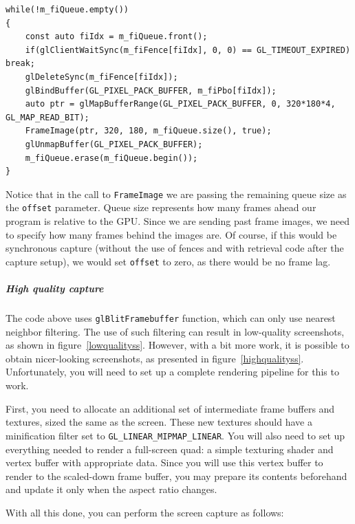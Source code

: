 \documentclass[hidelinks,titlepage,a4paper]{article}
\begin{document}
\begin{lstlisting}
while(!m_fiQueue.empty())
{
    const auto fiIdx = m_fiQueue.front();
    if(glClientWaitSync(m_fiFence[fiIdx], 0, 0) == GL_TIMEOUT_EXPIRED) break;
    glDeleteSync(m_fiFence[fiIdx]);
    glBindBuffer(GL_PIXEL_PACK_BUFFER, m_fiPbo[fiIdx]);
    auto ptr = glMapBufferRange(GL_PIXEL_PACK_BUFFER, 0, 320*180*4, GL_MAP_READ_BIT);
    FrameImage(ptr, 320, 180, m_fiQueue.size(), true);
    glUnmapBuffer(GL_PIXEL_PACK_BUFFER);
    m_fiQueue.erase(m_fiQueue.begin());
}
\end{lstlisting}

Notice that in the call to \texttt{FrameImage} we are passing the remaining queue size as the \texttt{offset} parameter. Queue size represents how many frames ahead our program is relative to the GPU. Since we are sending past frame images, we need to specify how many frames behind the images are. Of course, if this would be synchronous capture (without the use of fences and with retrieval code after the capture setup), we would set \texttt{offset} to zero, as there would be no frame lag.

\subparagraph{High quality capture}

The code above uses \texttt{glBlitFramebuffer} function, which can only use nearest neighbor filtering. The use of such filtering can result in low-quality screenshots, as shown in figure~\ref{lowqualityss}. However, with a bit more work, it is possible to obtain nicer-looking screenshots, as presented in figure~\ref{highqualityss}. Unfortunately, you will need to set up a complete rendering pipeline for this to work.

First, you need to allocate an additional set of intermediate frame buffers and textures, sized the same as the screen. These new textures should have a minification filter set to \texttt{GL\_LINEAR\_MIPMAP\_LINEAR}. You will also need to set up everything needed to render a full-screen quad: a simple texturing shader and vertex buffer with appropriate data. Since you will use this vertex buffer to render to the scaled-down frame buffer, you may prepare its contents beforehand and update it only when the aspect ratio changes.

With all this done, you can perform the screen capture as follows:
\end{document}
